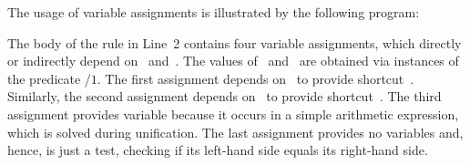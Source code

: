 \begin{example}\label{ex:assign}
The usage of variable assignments is illustrated by the following program:%
%
%

%
The body of the rule in Line~2 contains four variable assignments,
which directly or indirectly depend on~ and~.
The values of~ and~ are obtained via instances of the predicate /$1$.
The first assignment depends on~ to provide shortcut~.
Similarly, the second assignment depends on~ to provide shortcut~.
The third assignment provides variable  because it occurs in a simple arithmetic expression,
which is solved during unification.
The last assignment provides no variables and,
hence, is just a test,
checking if its left-hand side equals its right-hand side.
\eexample
\end{example}

